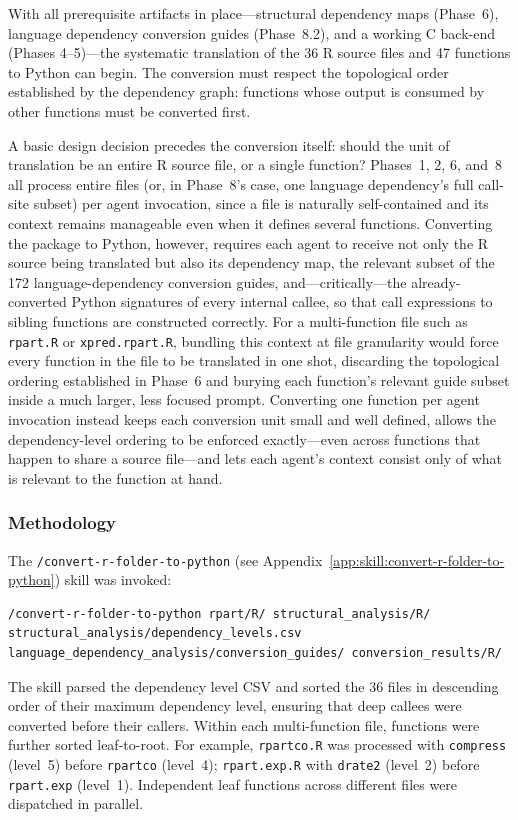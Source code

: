 \documentclass[12pt]{article}
\newcommand{\skillapp}[2]{\texttt{/#1} (see Appendix~\ref{app:skill:#2})}
\begin{document}
With all prerequisite artifacts in place---structural dependency maps (Phase~6), language dependency conversion guides (Phase~8.2), and a working C back-end (Phases 4--5)---the systematic translation of the 36 R source files and 47 functions to Python can begin. The conversion must respect the topological order established by the dependency graph: functions whose output is consumed by other functions must be converted first.

A basic design decision precedes the conversion itself: should the unit of translation be an entire R source file, or a single function? Phases~1, 2, 6, and~8 all process entire files (or, in Phase~8's case, one language dependency's full call-site subset) per agent invocation, since a file is naturally self-contained and its context remains manageable even when it defines several functions. Converting the package to Python, however, requires each agent to receive not only the R source being translated but also its dependency map, the relevant subset of the 172 language-dependency conversion guides, and---critically---the already-converted Python signatures of every internal callee, so that call expressions to sibling functions are constructed correctly. For a multi-function file such as \texttt{rpart.R} or \texttt{xpred.rpart.R}, bundling this context at file granularity would force every function in the file to be translated in one shot, discarding the topological ordering established in Phase~6 and burying each function's relevant guide subset inside a much larger, less focused prompt. Converting one function per agent invocation instead keeps each conversion unit small and well defined, allows the dependency-level ordering to be enforced exactly---even across functions that happen to share a source file---and lets each agent's context consist only of what is relevant to the function at hand.

\subsubsection{Methodology}

The \skillapp{convert-r-folder-to-python}{convert-r-folder-to-python} skill was invoked:
\begin{lstlisting}[style=skill]
/convert-r-folder-to-python rpart/R/ structural_analysis/R/ structural_analysis/dependency_levels.csv language_dependency_analysis/conversion_guides/ conversion_results/R/
\end{lstlisting}

The skill parsed the dependency level CSV and sorted the 36 files in descending order of their maximum dependency level, ensuring that deep callees were converted before their callers. Within each multi-function file, functions were further sorted leaf-to-root. For example, \texttt{rpartco.R} was processed with \texttt{compress} (level~5) before \texttt{rpartco} (level~4); \texttt{rpart.exp.R} with \texttt{drate2} (level~2) before \texttt{rpart.exp} (level~1). Independent leaf functions across different files were dispatched in parallel.
\end{document}
